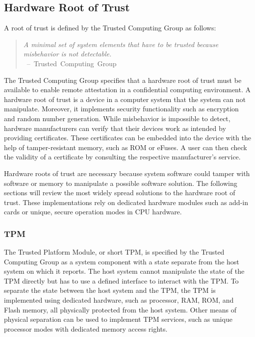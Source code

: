 
\subsection{Hardware Root of Trust}
\label{sec:20:hardware_root_of_trust}
A root of trust is defined by the Trusted Computing Group as follows:
\begin{quote}
    \textit{
        A minimal set of system elements that have to be trusted because misbehavior is not detectable. \\
    }
    \mbox{ -- Trusted Computing Group\cite{tpm_architecture}}
\end{quote}

The Trusted Computing Group specifies that a
hardware root of trust must be available to enable remote attestation in a confidential computing environment.\cite{tpm_architecture}
A hardware root of trust is a device in a computer system that the system can not manipulate. Moreover, it
implements security functionality such as encryption and random number generation. While misbehavior is impossible
to detect, hardware manufacturers can verify that their devices work as intended by providing certificates. These
certificates can be embedded into the device with the help of tamper-resistant memory, such as ROM or eFuses. A user can
then check the validity of a certificate by consulting the respective manufacturer's service.

Hardware roots of trust are necessary because system software could tamper with software or memory to manipulate a
possible software solution. The following sections will review the most widely spread solutions to the hardware root
of trust. These implementations rely on dedicated hardware modules such as add-in cards or unique, secure operation
modes in CPU hardware.

\subsubsection{TPM}
\label{sec:20:tpm}
The Trusted Platform Module, or short TPM, is specified by the Trusted Computing Group as a system component with
a state separate from the host system on which it reports.\cite{tpm_architecture} The host system cannot
manipulate the state of the TPM directly but has to use a defined interface to interact with the TPM. To separate
the state between the host system and the TPM, the TPM is implemented using dedicated hardware, such as processor, RAM,
ROM, and Flash memory, all physically protected from the host system. Other means of physical separation can be used to
implement TPM services, such as unique processor modes with dedicated memory access rights.

